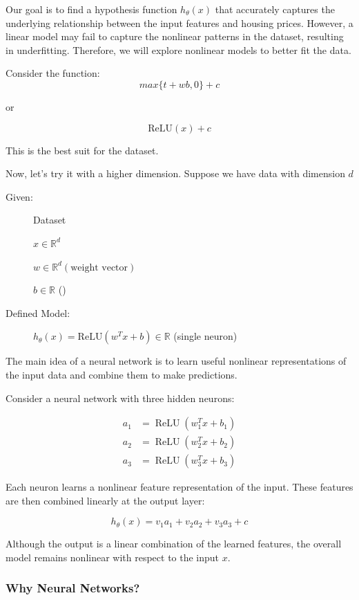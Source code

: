 \documentclass[12pt,a4paper]{report}
\begin{document}
Our goal is to find a hypothesis function $h_\theta(x)$ that accurately captures the underlying relationship between the input features and housing prices. However, a linear model may fail to capture the nonlinear patterns in the dataset, resulting in underfitting. Therefore, we will explore nonlinear models to better fit the data.

Consider the function:
\[
    max\{t + wb, 0 \}  + c
\]

or

\[
    \mathrm{ReLU}(x) + c
\]

This is the best suit for the dataset.

Now, let's try it with a higher dimension. Suppose we have data with dimension $d$

\begin{description}
    \item[Given: ] Dataset
    
    $x \in \mathbb{R}^d$
    
    $w \in \mathbb{R}^d (\text{weight vector})$ 

    $b \in \mathbb{R}$ ()

    \item[Defined Model: ] $h_\theta(x) = \mathrm{ReLU}(w^Tx + b) \in \mathbb{R}$ (single neuron) 
    
\end{description}

The main idea of a neural network is to learn useful nonlinear representations of the input data and combine them to make predictions.

Consider a neural network with three hidden neurons:

\[
\begin{aligned}
a_1 &= \operatorname{ReLU}(w_1^T x + b_1) \\
a_2 &= \operatorname{ReLU}(w_2^T x + b_2) \\
a_3 &= \operatorname{ReLU}(w_3^T x + b_3)
\end{aligned}
\]

Each neuron learns a nonlinear feature representation of the input. These features are then combined linearly at the output layer:

\[
\boxed{
h_\theta(x) = v_1a_1 + v_2a_2 + v_3a_3 + c
}
\]

Although the output is a linear combination of the learned features, the overall model remains nonlinear with respect to the input $x$.

\subsubsection{Why Neural Networks?}
\end{document}
